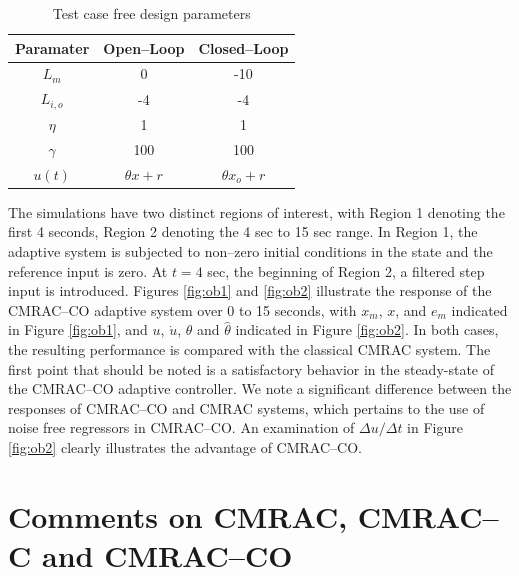 \documentclass[10pt,journal]{IEEEtran}
\theoremstyle{plain}%
\theoremstyle{definition}
\begin{document}
\begin{table}[h]
\caption{Test case free design parameters} \label{baus}
\centering
\begin{tabular}{c c c}
  Paramater & Open--Loop & Closed--Loop  \\ \hline
  $L_{m}$ & 0 & -10 \\
  $L_{i,o}$ & -4 & -4 \\
    $\eta$ & 1 & 1 \\
  $\gamma$ & 100 & 100 \\
   $u(t)$& $\theta x +r$ & $\theta x_o + r $ \\ \hline
\end{tabular}  \end{table}

The simulations have two distinct regions of interest, with Region 1 denoting the first 4 seconds, Region 2 denoting the 4 sec to 15 sec range. In Region 1, the adaptive system is subjected to non--zero initial conditions in the state and the reference input is zero. At $t=4$ sec, the beginning of Region 2, a filtered step input is introduced. Figures \ref{fig:ob1} and \ref{fig:ob2} illustrate the response of the CMRAC--CO adaptive system over 0 to 15 seconds, with $x_m$, $x$, and $e_m$ indicated in Figure \ref{fig:ob1}, and $u$, $\dot u$, $\theta$ and $\hat\theta$ indicated in Figure \ref{fig:ob2}. In both cases, the resulting performance is compared with the classical CMRAC system. The first point that should be noted is a satisfactory behavior in the steady-state of the CMRAC--CO adaptive controller.  We note a significant difference between the responses of CMRAC--CO and CMRAC systems, which pertains to the use of noise free regressors in CMRAC--CO. An examination of $\Delta u/ \Delta t$ in Figure \ref{fig:ob2} clearly illustrates the advantage of CMRAC--CO.





\section{Comments on CMRAC, CMRAC--C and CMRAC--CO}\label{sec:talker}
\end{document}
